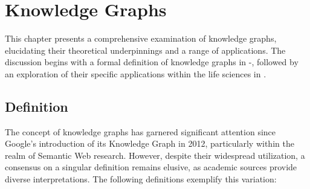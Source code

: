 \chapter{Knowledge Graphs}\label{kgs}
This chapter presents a comprehensive examination of knowledge graphs, elucidating their theoretical underpinnings and a range of applications. The discussion begins with a formal definition of knowledge graphs in -, followed by an exploration of their specific applications within the life sciences in .

\section{Definition}\label{definition}
The concept of knowledge graphs has garnered significant attention since Google's introduction of its Knowledge Graph in 2012, particularly within the realm of Semantic Web research. However, despite their widespread utilization, a consensus on a singular definition remains elusive, as academic sources provide diverse interpretations. The following definitions exemplify this variation:


